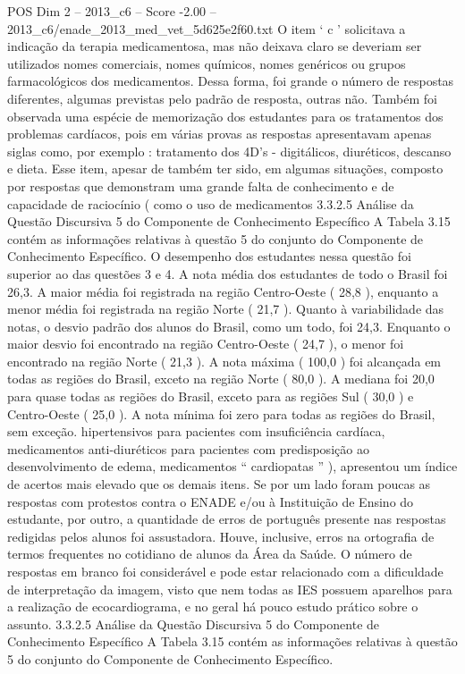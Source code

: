 \begin{textsample}{POS Dim 2 – 2013\_c6 – Score -2.00 – 2013\_c6/enade\_2013\_med\_vet\_5d625e2f60.txt}
O item ‘ c ’ solicitava a indicação da terapia medicamentosa, mas não deixava claro se deveriam ser utilizados nomes comerciais, nomes químicos, nomes genéricos ou grupos farmacológicos dos medicamentos.
Dessa forma, foi grande o número de respostas diferentes, algumas previstas pelo padrão de resposta, outras não.
Também foi observada uma espécie de memorização dos estudantes para os tratamentos dos problemas cardíacos, pois em várias provas as respostas apresentavam apenas siglas como, por exemplo : tratamento dos 4D’s - digitálicos, diuréticos, descanso e dieta.
Esse item, apesar de também ter sido, em algumas situações, composto por respostas que demonstram uma grande falta de conhecimento e de capacidade de raciocínio ( como o uso de medicamentos 3.3.2.5 Análise da Questão Discursiva 5 do Componente de Conhecimento Específico A Tabela 3.15 contém as informações relativas à questão 5 do conjunto do Componente de Conhecimento Específico.
O desempenho dos estudantes nessa questão foi superior ao das questões 3 e 4.
A nota média dos estudantes de todo o Brasil foi 26,3.
A maior média foi registrada na região Centro-Oeste ( 28,8 ), enquanto a menor média foi registrada na região Norte ( 21,7 ).
Quanto à variabilidade das notas, o desvio padrão dos alunos do Brasil, como um todo, foi 24,3.
Enquanto o maior desvio foi encontrado na região Centro-Oeste ( 24,7 ), o menor foi encontrado na região Norte ( 21,3 ).
A nota máxima ( 100,0 ) foi alcançada em todas as regiões do Brasil, exceto na região Norte ( 80,0 ).
A mediana foi 20,0 para quase todas as regiões do Brasil, exceto para as regiões Sul ( 30,0 ) e Centro-Oeste ( 25,0 ).
A nota mínima foi zero para todas as regiões do Brasil, sem exceção. hipertensivos para pacientes com insuficiência cardíaca, medicamentos anti-diuréticos para pacientes com predisposição ao desenvolvimento de edema, medicamentos “ cardiopatas ” ), apresentou um índice de acertos mais elevado que os demais itens.
Se por um lado foram poucas as respostas com protestos contra o ENADE e/ou à Instituição de Ensino do estudante, por outro, a quantidade de erros de português presente nas respostas redigidas pelos alunos foi assustadora.
Houve, inclusive, erros na ortografia de termos frequentes no cotidiano de alunos da Área da Saúde.
O número de respostas em branco foi considerável e pode estar relacionado com a dificuldade de interpretação da imagem, visto que nem todas as IES possuem aparelhos para a realização de ecocardiograma, e no geral há pouco estudo prático sobre o assunto. 3.3.2.5 Análise da Questão Discursiva 5 do Componente de Conhecimento Específico A Tabela 3.15 contém as informações relativas à questão 5 do conjunto do Componente de Conhecimento Específico.

\end{textsample}
